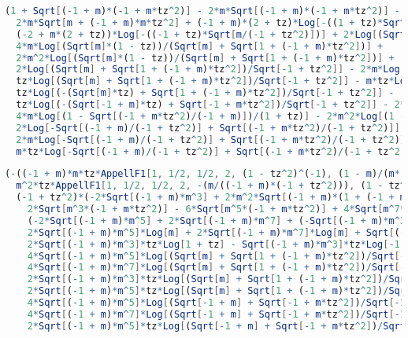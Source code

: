 \begin{lstlisting}[breaklines=true, caption={Expression for Type-II interband transition with \( t_z < -1 \), given in Mathematica format.\label{lst:typeii-interband-tzneg}},language=Mathematica]
(1 + Sqrt[(-1 + m)*(-1 + m*tz^2)] - 2*m*Sqrt[(-1 + m)*(-1 + m*tz^2)] - Sqrt[m + (-1 + m)*m*tz^2] +
  2*m*Sqrt[m + (-1 + m)*m*tz^2] + (-1 + m)*(2 + tz)*Log[-((1 + tz)*Sqrt[(-1 + m)/(-1 + tz^2)])] +
  (-2 + m*(2 + tz))*Log[-((-1 + tz)*Sqrt[m/(-1 + tz^2)])] + 2*Log[(Sqrt[m]*(1 - tz))/(Sqrt[m] + Sqrt[1 + (-1 + m)*tz^2])] -
  4*m*Log[(Sqrt[m]*(1 - tz))/(Sqrt[m] + Sqrt[1 + (-1 + m)*tz^2])] +
  2*m^2*Log[(Sqrt[m]*(1 - tz))/(Sqrt[m] + Sqrt[1 + (-1 + m)*tz^2])] +
  2*Log[(Sqrt[m] + Sqrt[1 + (-1 + m)*tz^2])/Sqrt[-1 + tz^2]] - 2*m*Log[(Sqrt[m] + Sqrt[1 + (-1 + m)*tz^2])/Sqrt[-1 + tz^2]] +
  tz*Log[(Sqrt[m] + Sqrt[1 + (-1 + m)*tz^2])/Sqrt[-1 + tz^2]] - m*tz*Log[(Sqrt[m] + Sqrt[1 + (-1 + m)*tz^2])/Sqrt[-1 + tz^2]] +
  tz*Log[(-(Sqrt[m]*tz) + Sqrt[1 + (-1 + m)*tz^2])/Sqrt[-1 + tz^2]] -
  tz*Log[(-(Sqrt[-1 + m]*tz) + Sqrt[-1 + m*tz^2])/Sqrt[-1 + tz^2]] - 2*Log[(1 - Sqrt[(-1 + m*tz^2)/(-1 + m)])/(1 + tz)] +
  4*m*Log[(1 - Sqrt[(-1 + m*tz^2)/(-1 + m)])/(1 + tz)] - 2*m^2*Log[(1 - Sqrt[(-1 + m*tz^2)/(-1 + m)])/(1 + tz)] +
  2*Log[-Sqrt[(-1 + m)/(-1 + tz^2)] + Sqrt[(-1 + m*tz^2)/(-1 + tz^2)]] -
  2*m*Log[-Sqrt[(-1 + m)/(-1 + tz^2)] + Sqrt[(-1 + m*tz^2)/(-1 + tz^2)]] -
  m*tz*Log[-Sqrt[(-1 + m)/(-1 + tz^2)] + Sqrt[(-1 + m*tz^2)/(-1 + tz^2)]])
\end{lstlisting}

\begin{lstlisting}[breaklines=true, caption={Expression for Type-II intraband transition with \( t_z > 1 \), given in Mathematica format.\label{lst:typeii-intraband-tzpos}},language=Mathematica]
(-((-1 + m)*m*tz*AppellF1[1, 1/2, 1/2, 2, (1 - tz^2)^(-1), (1 - m)/(m*(-1 + tz^2))]) +
  m^2*tz*AppellF1[1, 1/2, 1/2, 2, -(m/((-1 + m)*(-1 + tz^2))), (1 - tz^2)^(-1)] +
  (-1 + tz^2)*(-2*Sqrt[(-1 + m)*m^3] + 2*m^2*Sqrt[(-1 + m)*(1 + (-1 + m)*tz^2)] - 4*m^3*Sqrt[(-1 + m)*(1 + (-1 + m)*tz^2)] +
    2*Sqrt[m^3*(-1 + m*tz^2)] - 6*Sqrt[m^5*(-1 + m*tz^2)] + 4*Sqrt[m^7*(-1 + m*tz^2)] -
    (-2*Sqrt[(-1 + m)*m^5] + 2*Sqrt[(-1 + m)*m^7] + (-Sqrt[(-1 + m)*m^3] + Sqrt[(-1 + m)*m^5])*tz)*Log[-1 + m] -
    2*Sqrt[(-1 + m)*m^5]*Log[m] + 2*Sqrt[(-1 + m)*m^7]*Log[m] + Sqrt[(-1 + m)*m^5]*tz*Log[m] +
    2*Sqrt[(-1 + m)*m^3]*tz*Log[1 + tz] - Sqrt[(-1 + m)*m^3]*tz*Log[-1 + tz^2] -
    4*Sqrt[(-1 + m)*m^5]*Log[(Sqrt[m] + Sqrt[1 + (-1 + m)*tz^2])/Sqrt[-1 + tz^2]] +
    4*Sqrt[(-1 + m)*m^7]*Log[(Sqrt[m] + Sqrt[1 + (-1 + m)*tz^2])/Sqrt[-1 + tz^2]] -
    2*Sqrt[(-1 + m)*m^3]*tz*Log[(Sqrt[m] + Sqrt[1 + (-1 + m)*tz^2])/Sqrt[-1 + tz^2]] +
    2*Sqrt[(-1 + m)*m^5]*tz*Log[(Sqrt[m] + Sqrt[1 + (-1 + m)*tz^2])/Sqrt[-1 + tz^2]] +
    4*Sqrt[(-1 + m)*m^5]*Log[(Sqrt[-1 + m] + Sqrt[-1 + m*tz^2])/Sqrt[-1 + tz^2]] -
    4*Sqrt[(-1 + m)*m^7]*Log[(Sqrt[-1 + m] + Sqrt[-1 + m*tz^2])/Sqrt[-1 + tz^2]] -
    2*Sqrt[(-1 + m)*m^5]*tz*Log[(Sqrt[-1 + m] + Sqrt[-1 + m*tz^2])/Sqrt[-1 + tz^2]]))/(2*Sqrt[-1 + m]*m^(3/2)*(-1 + tz^2))
\end{lstlisting}

